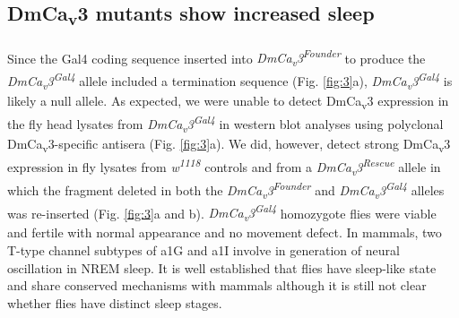 \subsection*{DmCa\textsubscript{v}3 mutants show increased sleep}

Since the Gal4 coding sequence inserted into \emph{DmCa\textsubscript{v}3\textsuperscript{Founder}} to produce the \emph{DmCa\textsubscript{v}3\textsuperscript{Gal4}} allele included a termination sequence (Fig. \ref{fig:3}a), \emph{DmCa\textsubscript{v}3\textsuperscript{Gal4}} is likely a null allele.
As expected, we were unable to detect DmCa\textsubscript{v}3 expression in the fly head lysates from \emph{DmCa\textsubscript{v}3\textsuperscript{Gal4}} in western blot analyses using polyclonal DmCa\textsubscript{v}3-specific antisera (Fig. \ref{fig:3}a). We did, however, detect strong DmCa\textsubscript{v}3 expression in fly lysates from \emph{w\textsuperscript{1118}} controls and from a \emph{DmCa\textsubscript{v}3\textsuperscript{Rescue}} allele in which the fragment deleted in both the \emph{DmCa\textsubscript{v}3\textsuperscript{Founder}} and \emph{DmCa\textsubscript{v}3\textsuperscript{Gal4}} alleles was re-inserted (Fig. \ref{fig:3}a and b).
\emph{DmCa\textsubscript{v}3\textsuperscript{Gal4}} homozygote flies were viable and fertile with normal appearance and no movement defect.
In mammals, two T-type channel subtypes of a1G and a1I involve in generation of neural oscillation in NREM sleep.
It is well established that flies have sleep-like state and share conserved mechanisms with mammals although it is still not clear whether flies have distinct sleep stages.

